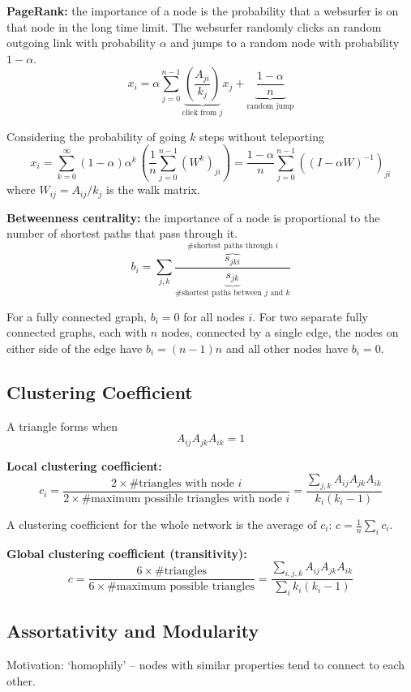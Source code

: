 \documentclass[12pt]{article}
\begin{document}
\textbf{PageRank:} the importance of a node is the probability that a websurfer is on that node in the long time limit. The websurfer randomly clicks an random outgoing link with probability $\alpha$ and jumps to a random node with probability $1 - \alpha$.
$$x_i = \alpha \sum_{j=0}^{n-1} \underbrace{\left(\frac{A_{ji}}{k_j}\right)}_{\text{click from $j$}}x_j + \underbrace{\frac{1 - \alpha}{n}}_{\text{random jump}}$$

Considering the probability of going $k$ steps without teleporting
$$x_i = \sum_{k=0}^{\infty} (1 - \alpha) \alpha^k \, \left(\frac{1}{n} \sum_{j=0}^{n-1} (W^k)_{ji}\right) = \frac{1-\alpha}{n} \sum_{j=0}^{n-1} \left((I - \alpha W)^{-1}\right)_{ji}$$
where $W_{ij} = A_{ij}/k_j$ is the walk matrix.

\textbf{Betweenness centrality:} the importance of a node is proportional to the number of shortest paths that pass through it.
$$
b_i = \sum_{j,k} \frac{\overbrace{s_{jki}}^{\text{\# shortest paths through } i}}{\underbrace{s_{jk}}_{\text{\# shortest paths between $j$ and $k$}}}
$$

For a fully connected graph, $b_i = 0$ for all nodes $i$. For two separate fully connected graphs, each with $n$ nodes, connected by a single edge, the nodes on either side of the edge have $b_i = (n-1)n$ and all other nodes have $b_i = 0$.

\subsection{Clustering Coefficient}
A triangle forms when $$A_{ij} A_{jk} A_{ik} = 1$$

\textbf{Local clustering coefficient:} 
$$c_i = \frac{2 \times \text{\# triangles with node $i$}}{2 \times \text{\# maximum possible triangles with node $i$}} = \frac{\sum_{j,k} A_{ij} A_{jk} A_{ik}}{k_i(k_i - 1)}$$

A clustering coefficient for the whole network is the average of $c_i$: $c = \frac{1}{n} \sum_i c_i$.

\textbf{Global clustering coefficient (transitivity):}
$$c = \frac{6 \times \text{\# triangles}}{6 \times \text{\# maximum possible triangles}} = \frac{\sum_{i,j,k} A_{ij} A_{jk} A_{ik}}{\sum_i k_i(k_i - 1)}$$

\subsection{Assortativity and Modularity}
Motivation: `homophily' – nodes with similar properties tend to connect to each other.
\end{document}

